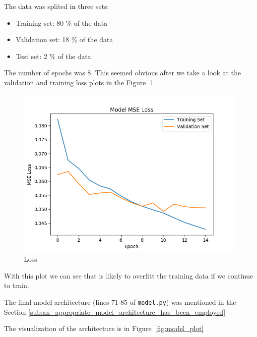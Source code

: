 \documentclass[11pt, a4paper]{article}
\begin{document}
The data was splited in three sets:
\begin{itemize}
	\item Training set: 80 \% of the data 
	\item Validation set: 18 \% of the data
	\item Test set: 2 \% of the data
\end{itemize}




The number of epochs was 8. This seemed obvious after we take a look at the validation and training loss plots in the Figure~\ref{fig:loss}

\begin{figure}[htpb!]
	\centering
	\includegraphics[width=0.8\linewidth]{loss}
	\caption{Loss}
	\label{fig:loss}
\end{figure}

With this plot we can see that is likely to overfitt the training data if we continue to train.




The final model architecture (lines 71-85 of \texttt{model.py}) was mentioned in the Section \ref{sub:an_appropriate_model_architecture_has_been_employed}

The visualization of the architecture is in Figure~\ref{fig:model_plot}
\end{document}
